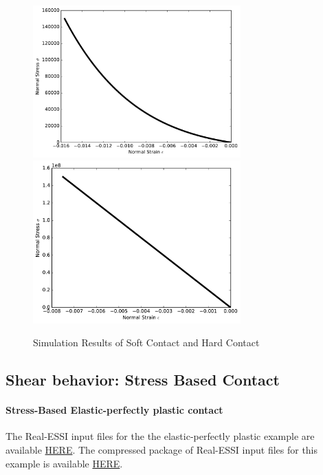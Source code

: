 \begin{figure}[H]
  \centering
  \includegraphics[width = 8cm]{./Figure-files/Day3/Contact_Examples/softcontact.pdf}
  \includegraphics[width = 8cm]{./Figure-files/Day3/Contact_Examples/hardcontact.pdf}
  \caption{Simulation Results of Soft Contact and Hard Contact}
  \label{fig_soft_hard_contact}
\end{figure}






\clearpage
\newpage
\subsection{ Shear behavior: Stress Based Contact }


\paragraph{Stress-Based Elastic-perfectly plastic contact}
The Real-ESSI input files for the the elastic-perfectly plastic example are available 
\href{https://github.com/yuan-energy/Real-ESSI-Short-Course-Examples/tree/master/short-course-examples/Day3/Contact_Examples/shear/SoftContact_Elastic_Perfectly_Plastic_Shear_Model}{HERE}. 
The compressed package of Real-ESSI input files for this example is available 
\href{https://github.com/yuan-energy/Real-ESSI-Short-Course-Examples/blob/master/short-course-examples/Day3/Contact_Examples/shear/SoftContact_Elastic_Perfectly_Plastic_Shear_Model/SoftContact_Elastic_Perfectly_Plastic_Shear_Model.tgz?raw=true}{HERE}. 


